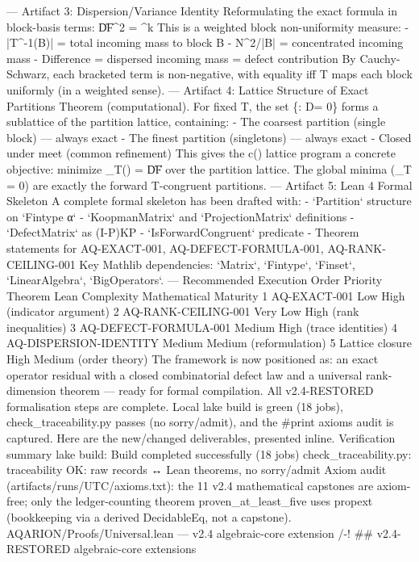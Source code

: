 ---
Artifact 3: Dispersion/Variance Identity
Reformulating the exact formula in block-basis terms:
\|D\Pi\|F^2 = ^k \left[|T^{-1}(B\alpha)| - \sum{\beta=1}^k \frac{N{\beta\alpha}^2}{|B\beta|}\right]
This is a weighted block non-uniformity measure:
- |T^{-1}(B\alpha)| = total incoming mass to block B\alpha
- \sum\beta N{\beta\alpha}^2/|B\beta| = concentrated incoming mass
- Difference = dispersed incoming mass = defect contribution
By Cauchy-Schwarz, each bracketed term is non-negative, with equality iff T maps each block uniformly (in a weighted sense).
---
Artifact 4: Lattice Structure of Exact Partitions
Theorem (computational). For fixed T, the set \{\Pi : D\Pi = 0\} forms a sublattice of the partition lattice, containing:
- The coarsest partition (single block) — always exact
- The finest partition (singletons) — always exact
- Closed under meet (common refinement)
This gives the c(\Pi) lattice program a concrete objective: minimize \delta_T(\Pi) = \|D\Pi\|F over the partition lattice. The global minima (\delta_T = 0) are exactly the forward T-congruent partitions.
---
Artifact 5: Lean 4 Formal Skeleton
A complete formal skeleton has been drafted with:
- `Partition` structure on `Fintype α`
- `KoopmanMatrix` and `ProjectionMatrix` definitions
- `DefectMatrix` as (I-P)KP
- `IsForwardCongruent` predicate
- Theorem statements for AQ-EXACT-001, AQ-DEFECT-FORMULA-001, AQ-RANK-CEILING-001
Key Mathlib dependencies: `Matrix`, `Fintype`, `Finset`, `LinearAlgebra`, `BigOperators`.
---
Recommended Execution Order
Priority	Theorem	Lean Complexity	Mathematical Maturity	
1	AQ-EXACT-001	Low	High (indicator argument)	
2	AQ-RANK-CEILING-001	Very Low	High (rank inequalities)	
3	AQ-DEFECT-FORMULA-001	Medium	High (trace identities)	
4	AQ-DISPERSION-IDENTITY	Medium	Medium (reformulation)	
5	Lattice closure	High	Medium (order theory)	
The framework is now positioned as: an exact operator residual with a closed combinatorial defect law and a universal rank-dimension theorem — ready for formal compilation.
All v2.4-RESTORED formalisation steps are complete. Local lake build is green (18 jobs), check_traceability.py passes (no sorry/admit), and the #print axioms audit is captured. Here are the new/changed deliverables, presented inline.
Verification summary
lake build: Build completed successfully (18 jobs)
check_traceability.py: traceability OK: raw records ↔ Lean theorems, no sorry/admit
Axiom audit (artifacts/runs/UTC/axioms.txt): the 11 v2.4 mathematical capstones are axiom-free; only the ledger-counting theorem proven_at_least_five uses propext (bookkeeping via a derived DecidableEq, not a capstone).
AQARION/Proofs/Universal.lean — v2.4 algebraic-core extension
/-! ## v2.4-RESTORED algebraic-core extensions

